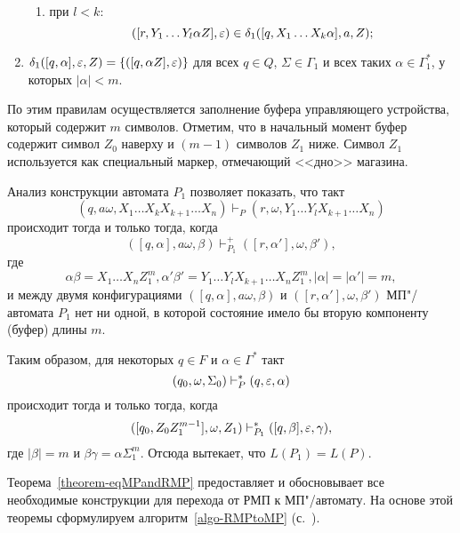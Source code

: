 \begin{myproof}
\begin{enumerate}
\begin{enumerate}
        \item при $l<k$:
        \[
        ([r,Y_1\ldots Y_l\alpha Z],\varepsilon) \in
            \delta_1([q,X_1\ldots X_k\alpha],a,Z);
        \]
    \end{enumerate}

    \item $\delta_1([q,\alpha],\varepsilon,Z)=\{([q,\alpha Z],\varepsilon)\}$ для
    всех $q\in Q$, $\Sigma\in\Gamma_1$ и всех таких
    $\alpha\in\Gamma_1^*$, у которых $|\alpha|<m$.

\end{enumerate}
По этим правилам осуществляется заполнение буфера управляющего устройства, который содержит $m$ символов. Отметим, что в начальный момент буфер содержит символ $Z_0$ наверху и $(m-1)$ символов $Z_1$ ниже. Символ $Z_1$ используется как специальный маркер, отмечающий <<дно>> магазина.

Анализ конструкции автомата $P_1$ позволяет показать, что такт
\[
    (q,a\omega,X_1\ldots X_kX_{k+1}\ldots X_n) \vdash_P
        (r,\omega,Y_1 \ldots Y_lX_{k+1} \ldots X_n)
\]
происходит тогда и только тогда, когда
\[
    ( [q,\alpha],a\omega,\beta ) \vdash_{P_1}^+
        ([r,\alpha'],\omega,\beta' ),
\]
где
\[
    \alpha\beta = X_1\ldots X_nZ_1^m, \alpha'\beta' =
        Y_1 \ldots Y_lX_{k+1} \ldots X_nZ_1^m, |\alpha| = |\alpha'| = m,
\]
и между двумя
конфигурациями $([q,\alpha],a\omega,\beta)$ и
$([r,\alpha'],\omega,\beta')$ МП"/автомата $P_1$ нет ни
одной, в которой состояние имело бы вторую компоненту (буфер) длины
$m$.

Таким образом, для некоторых $q\in F$ и $\alpha\in\Gamma^*$ такт
\[
(q_0,\omega,\Sigma_0) \vdash_P^* (q,\varepsilon,\alpha)
\]
происходит тогда и только тогда, когда
\[
([q_0,Z_0Z_1^{m-1}],\omega,Z_1) \vdash_{P_1}^*([q,\beta],\varepsilon,\gamma),
\]
где $|\beta|=m$ и $\beta\gamma=\alpha\Sigma_1^m$. Отсюда вытекает, что $L(P_1)=L(P)$.
\end{myproof}

Теорема~\ref{theorem-eqMPandRMP} предоставляет и обосновывает все необходимые конструкции для перехода от РМП к МП"/автомату. На основе этой теоремы сформулируем алгоритм~\ref{algo-RMPtoMP} (с.~\pageref{algo-RMPtoMP}).

